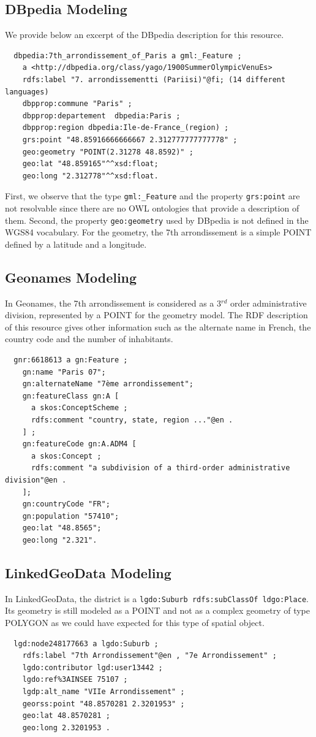 \begin{itemize}
\subsection{DBpedia Modeling}
We provide below an excerpt of the DBpedia description for this resource.
{\scriptsize
\begin{verbatim}
  dbpedia:7th_arrondissement_of_Paris a gml:_Feature ;
    a <http://dbpedia.org/class/yago/1900SummerOlympicVenuEs>
    rdfs:label "7. arrondissementti (Pariisi)"@fi; (14 different languages)
    dbpprop:commune "Paris" ;
    dbpprop:departement  dbpedia:Paris ;
    dbpprop:region dbpedia:Ile-de-France_(region) ;
    grs:point "48.85916666666667 2.312777777777778" ;
    geo:geometry "POINT(2.31278 48.8592)" ;
    geo:lat "48.859165"^^xsd:float;
    geo:long "2.312778"^^xsd:float.
\end{verbatim}
}
First, we observe that the type \texttt{gml:\_Feature} and the property \texttt{grs:point} are not resolvable since there are no OWL ontologies that provide a description of them. Second, the property \texttt{geo:geometry} used by DBpedia is not defined in the WGS84 vocabulary. For the geometry, the 7th arrondissement is a simple POINT defined by a latitude and a longitude.

\subsection{Geonames Modeling}
In Geonames, the 7th arrondissement is considered as a 3$^{rd}$ order administrative division, represented by a POINT for the geometry model. The RDF description of this resource gives other information such as the alternate name in French, the country code and the number of inhabitants.
{\scriptsize
\begin{verbatim}
  gnr:6618613 a gn:Feature ;
    gn:name "Paris 07";
    gn:alternateName "7ème arrondissement";
    gn:featureClass gn:A [
      a skos:ConceptScheme ;
      rdfs:comment "country, state, region ..."@en .
    ] ;
    gn:featureCode gn:A.ADM4 [
      a skos:Concept ;
      rdfs:comment "a subdivision of a third-order administrative division"@en .
    ];
    gn:countryCode "FR";
    gn:population "57410";
    geo:lat "48.8565";
    geo:long "2.321".
\end{verbatim}
}

\subsection{LinkedGeoData Modeling}
In LinkedGeoData, the district is a \texttt{lgdo:Suburb rdfs:subClassOf ldgo:Place}. Its geometry is still modeled as a POINT and not as a complex geometry of type POLYGON as we could have expected for this type of spatial object.
{\scriptsize
\begin{verbatim}
  lgd:node248177663 a lgdo:Suburb ;
    rdfs:label "7th Arrondissement"@en , "7e Arrondissement" ;
    lgdo:contributor lgd:user13442 ;
    lgdo:ref%3AINSEE 75107 ;
    lgdp:alt_name "VIIe Arrondissement" ;
    georss:point "48.8570281 2.3201953" ;
    geo:lat 48.8570281 ;
    geo:long 2.3201953 .
\end{verbatim}
}


\end{itemize}
